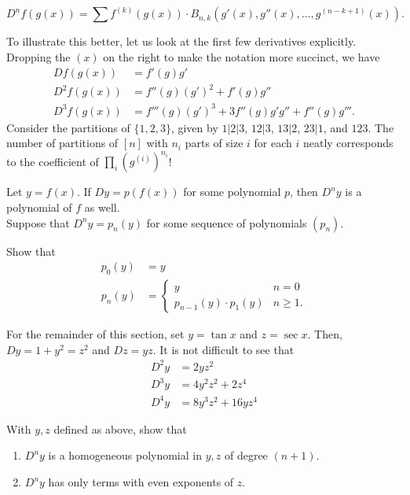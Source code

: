 	\begin{fprop}
		\[ D^n f(g(x)) = \sum f^{(k)}(g(x)) \cdot B_{n,k} (g'(x), g''(x), \ldots, g^{(n-k+1)}(x)). \]
	\end{fprop}

	To illustrate this better, let us look at the first few derivatives explicitly. Dropping the $(x)$ on the right to make the notation more succinct, we have
	\begin{align*}
		Df(g(x)) &= f'(g) g' \\
		D^2f(g(x)) &= f''(g) (g')^2 + f'(g) g'' \\
		D^3f(g(x)) &= f'''(g) (g')^3 + 3 f''(g) g' g'' + f''(g) g'''.
	\end{align*}
	Consider the partitions of $\{1,2,3\}$, given by $1|2|3$, $12|3$, $13|2$, $23|1$, and $123$. The number of partitions of $[n]$ with $n_i$ parts of size $i$ for each $i$ neatly corresponds to the coefficient of $\prod_i (g^{(i)})^{n_i}$!


	Let $y = f(x)$. If $Dy = p(f(x))$ for some polynomial $p$, then $D^ny$ is a polynomial of $f$ as well.\\
	Suppose that $D^ny = p_n(y)$ for some sequence of polynomials $(p_n)$.
	\begin{exercise}
		Show that
		\begin{align*}
			p_0(y) &= y \\
			p_n(y) &= \begin{cases} y & n=0 \\ p_{n-1}(y) \cdot p_1(y) & n \ge 1. \end{cases}
		\end{align*}
	\end{exercise}

	For the remainder of this section, set $y = \tan x$ and $z = \sec x$. Then, $Dy = 1+y^2 = z^2$ and $Dz = yz$. It is not difficult to see that
	\begin{align*}
		D^2y &= 2yz^2 \\
		D^3y &= 4y^2z^2 + 2z^4 \\
		D^4y &= 8y^3z^2 + 16yz^4
	\end{align*}

	\begin{exercise}
		With $y,z$ defined as above, show that
		\begin{enumerate}
			\item $D^ny$ is a homogeneous polynomial in $y,z$ of degree $(n+1)$.
			\item $D^ny$ has only terms with even exponents of $z$.
		\end{enumerate}
	\end{exercise}


